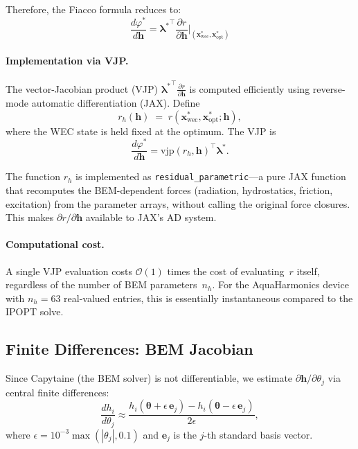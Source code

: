 \documentclass[11pt,a4paper]{article}
\newcommand{\vp}{\varphi}
\newcommand{\xwec}{\bm{x}_{\mathrm{wec}}}
\newcommand{\xopt}{\bm{x}_{\mathrm{opt}}}
\newcommand{\bh}{\bm{h}}
\newcommand{\blam}{\bm{\lambda}}
\newcommand{\btheta}{\bm{\theta}}
\newcommand{\pd}[2]{\frac{\partial #1}{\partial #2}}
\newcommand{\dd}[2]{\frac{d #1}{d #2}}
\begin{document}
Therefore, the Fiacco formula reduces to:
\begin{equation}
\label{eq:fiacco_reduced}
\boxed{
    \dd{\vp^*}{\bh}
    = {\blam^*}^\top \pd{r}{\bh}\bigg|_{(\xwec^*, \xopt^*)}
}
\end{equation}

\paragraph{Implementation via VJP.}
The vector-Jacobian product (VJP) ${\blam^*}^\top
\frac{\partial r}{\partial \bh}$ is computed efficiently using
reverse-mode automatic differentiation (JAX).  Define
\begin{equation}
    r_h(\bh) \;=\; r(\xwec^*, \xopt^*; \bh),
\end{equation}
where the WEC state is held fixed at the optimum.  The VJP is
\begin{equation}
    \dd{\vp^*}{\bh} = \text{vjp}(r_h, \bh)^\top \blam^* .
\end{equation}

The function $r_h$ is implemented as
\texttt{residual\_parametric}---a pure JAX function that recomputes
the BEM-dependent forces (radiation, hydrostatics, friction,
excitation) from the parameter arrays, without calling the original
force closures.  This makes $\partial r / \partial \bh$ available to
JAX's AD system.

\paragraph{Computational cost.}
A single VJP evaluation costs $\mathcal{O}(1)$ times the cost of
evaluating~$r$ itself, regardless of the number of BEM
parameters~$n_h$.  For the AquaHarmonics device with $n_h = 63$
real-valued entries, this is essentially instantaneous compared to
the IPOPT solve.

\subsection{Finite Differences: BEM Jacobian}
\label{sec:fd_bem}

Since Capytaine (the BEM solver) is not differentiable, we estimate
$\partial \bh / \partial \theta_j$ via central finite differences:
\begin{equation}
\label{eq:fd_bem}
    \dd{h_i}{\theta_j}
    \approx \frac{h_i(\btheta + \epsilon\,\bm{e}_j)
                - h_i(\btheta - \epsilon\,\bm{e}_j)}{2\epsilon},
\end{equation}
where $\epsilon = 10^{-3} \max(|\theta_j|, 0.1)$ and $\bm{e}_j$ is
the $j$-th standard basis vector.
\end{document}
